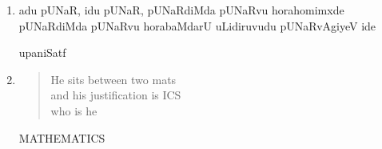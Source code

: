\begin{enumerate}[\rm 1)]
\item adu pUNaR, idu pUNaR, pUNaRdiMda pUNaRvu horahomimxde pUNaRdiMda pUNaRvu horabaMdarU uLidiruvudu pUNaRvAgiyeV ide
\begin{flushright}
upaniSatf
\end{flushright}

\item 
\begin{verse}
{\rm He sits between two mats}\\
{\rm and his justification is ICS}\\
{\rm who is he}
\end{verse}
\begin{flushright}
{\rm MATHEMATICS}
\end{flushright}
\end{enumerate}
